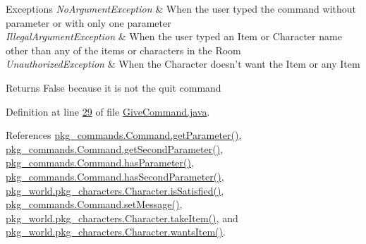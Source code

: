\begin{DoxyExceptions}{Exceptions}
{\em No\-Argument\-Exception} & When the user typed the command without parameter or with only one parameter \\
\hline
{\em Illegal\-Argument\-Exception} & When the user typed an Item or Character name other than any of the items or characters in the Room \\
\hline
{\em Unauthorized\-Exception} & When the Character doesn't want the Item or any Item \\
\hline
\end{DoxyExceptions}
\begin{DoxyReturn}{Returns}
False because it is not the quit command 
\end{DoxyReturn}


Definition at line \hyperlink{GiveCommand_8java_source_l00029}{29} of file \hyperlink{GiveCommand_8java_source}{Give\-Command.\-java}.



References \hyperlink{Command_8java_source_l00041}{pkg\-\_\-commands.\-Command.\-get\-Parameter()}, \hyperlink{Command_8java_source_l00049}{pkg\-\_\-commands.\-Command.\-get\-Second\-Parameter()}, \hyperlink{Command_8java_source_l00073}{pkg\-\_\-commands.\-Command.\-has\-Parameter()}, \hyperlink{Command_8java_source_l00081}{pkg\-\_\-commands.\-Command.\-has\-Second\-Parameter()}, \hyperlink{Character_8java_source_l00131}{pkg\-\_\-world.\-pkg\-\_\-characters.\-Character.\-is\-Satisfied()}, \hyperlink{Command_8java_source_l00089}{pkg\-\_\-commands.\-Command.\-set\-Message()}, \hyperlink{Character_8java_source_l00108}{pkg\-\_\-world.\-pkg\-\_\-characters.\-Character.\-take\-Item()}, and \hyperlink{Character_8java_source_l00119}{pkg\-\_\-world.\-pkg\-\_\-characters.\-Character.\-wants\-Item()}.



